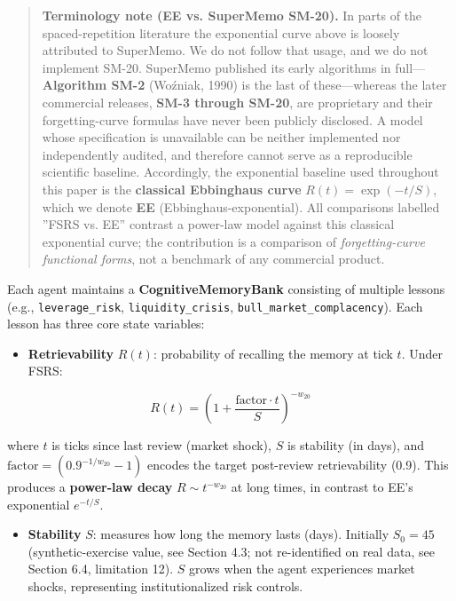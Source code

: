 \documentclass[11pt]{article}
\begin{document}
\begin{quote}
\textbf{Terminology note (EE vs. SuperMemo SM-20).} In parts of the spaced-repetition literature the exponential curve above is loosely attributed to SuperMemo. We do not follow that usage, and we do not implement SM-20. SuperMemo published its early algorithms in full---\textbf{Algorithm SM-2} (Woźniak, 1990) is the last of these---whereas the later commercial releases, \textbf{SM-3 through SM-20}, are proprietary and their forgetting-curve formulas have never been publicly disclosed. A model whose specification is unavailable can be neither implemented nor independently audited, and therefore cannot serve as a reproducible scientific baseline. Accordingly, the exponential baseline used throughout this paper is the \textbf{classical Ebbinghaus curve} $R(t)=\exp(-t/S)$, which we denote \textbf{EE} (Ebbinghaus-exponential). All comparisons labelled ''FSRS vs. EE'' contrast a power-law model against this classical exponential curve; the contribution is a comparison of \textit{forgetting-curve functional forms}, not a benchmark of any commercial product.
\end{quote}

Each agent maintains a \textbf{CognitiveMemoryBank} consisting of multiple lessons (e.g., \texttt{leverage\_risk}, \texttt{liquidity\_crisis}, \texttt{bull\_market\_complacency}). Each lesson has three core state variables:

\begin{itemize}
\item \textbf{Retrievability} $R(t)$: probability of recalling the memory at tick $t$. Under FSRS:
\end{itemize}

\[
R(t) = \left(1 + \frac{\text{factor} \cdot t}{S}\right)^{-w_{20}}
\]

where $t$ is ticks since last review (market shock), $S$ is stability (in days), and $\text{factor} = (0.9^{-1/w_{20}} - 1)$ encodes the target post-review retrievability (0.9). This produces a \textbf{power-law decay} $R \sim t^{-w_{20}}$ at long times, in contrast to EE's exponential $e^{-t/S}$.

\begin{itemize}
\item \textbf{Stability} $S$: measures how long the memory lasts (days). Initially $S_0 = 45$ (synthetic-exercise value, see Section 4.3; not re-identified on real data, see Section 6.4, limitation 12). $S$ grows when the agent experiences market shocks, representing institutionalized risk controls.
\end{itemize}
\end{document}
